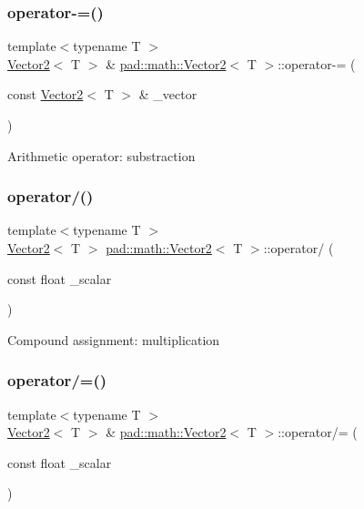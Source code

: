 \subsubsection{\texorpdfstring{operator-\/=()}{operator-=()}}
{\footnotesize\ttfamily template$<$typename T $>$ \\
\mbox{\hyperlink{structpad_1_1math_1_1_vector2}{Vector2}}$<$ T $>$ \& \mbox{\hyperlink{structpad_1_1math_1_1_vector2}{pad\+::math\+::\+Vector2}}$<$ T $>$\+::operator-\/= (\begin{DoxyParamCaption}\item[{const \mbox{\hyperlink{structpad_1_1math_1_1_vector2}{Vector2}}$<$ T $>$ \&}]{\+\_\+vector }\end{DoxyParamCaption})}

Arithmetic operator\+: substraction \mbox{\label{structpad_1_1math_1_1_vector2_adc54031c4f4593cda1860f3fd0b3f1dc}} 
\subsubsection{\texorpdfstring{operator/()}{operator/()}}
{\footnotesize\ttfamily template$<$typename T $>$ \\
\mbox{\hyperlink{structpad_1_1math_1_1_vector2}{Vector2}}$<$ T $>$ \mbox{\hyperlink{structpad_1_1math_1_1_vector2}{pad\+::math\+::\+Vector2}}$<$ T $>$\+::operator/ (\begin{DoxyParamCaption}\item[{const float}]{\+\_\+scalar }\end{DoxyParamCaption})}

Compound assignment\+: multiplication \mbox{\label{structpad_1_1math_1_1_vector2_a7fa51370af7bcda161bc803d13e52789}} 
\subsubsection{\texorpdfstring{operator/=()}{operator/=()}}
{\footnotesize\ttfamily template$<$typename T $>$ \\
\mbox{\hyperlink{structpad_1_1math_1_1_vector2}{Vector2}}$<$ T $>$ \& \mbox{\hyperlink{structpad_1_1math_1_1_vector2}{pad\+::math\+::\+Vector2}}$<$ T $>$\+::operator/= (\begin{DoxyParamCaption}\item[{const float}]{\+\_\+scalar }\end{DoxyParamCaption})}

